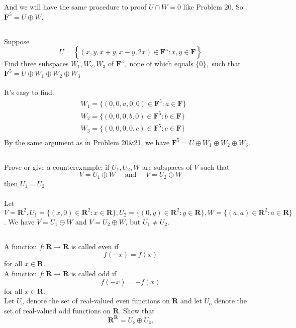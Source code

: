 \documentclass[a4paper]{article}
\begin{document}
And we will have the same procedure to proof $U \cap W = {0}$ like Problem 20. So $\mathbf{F}^{5}=U \oplus W$.

\subsection{}
Suppose
\[
    U=\left\{(x, y, x+y, x-y, 2 x) \in \mathbf{F}^{5}: x, y \in \mathbf{F}\right\}
\]
Find three subspaces $W_{1}, W_{2}, W_{3}$ of $\mathbf{F}^{5},$ none of which equals $\{0\},$ such that $\mathbf{F}^{5}=U \oplus W_{1} \oplus W_{2} \oplus W_{3}$
\paragraph{}
It's easy to find.
\[
    \begin{aligned}
         & W_1 = \{(0,0,a,0,0) \in \mathbf{F}^5: a \in \mathbf{F}\} \\
         & W_2 = \{(0,0,0,b,0) \in \mathbf{F}^5: b \in \mathbf{F}\} \\
         & W_3 = \{(0,0,0,0,c) \in \mathbf{F}^5: c \in \mathbf{F}\} \\
    \end{aligned}
\]
By the same argument as in Problem 20\&21, we have $\mathbf{F}^5 = U \oplus W_1 \oplus W_2 \oplus W_3$.

\subsection{}
Prove or give a counterexample: if $U_{1}, U_{2}, W$ are subspaces of $V$ such that
\[
    V=U_{1} \oplus W \quad \text { and } \quad V=U_{2} \oplus W
\]
then $U_{1}=U_{2}$
\paragraph{}
Let $V = \mathbf{R}^2, U_1 = \{(x,0)\in \mathbf{R}^2 : x\in \mathbf{R}\}, U_2 = \{(0,y)\in \mathbf{R}^2 : y\in \mathbf{R}\}, W = \{(a,a)\in \mathbf{R}^2: a\in \mathbf{R}\}$.
We have $V = U_1 \oplus W$ and $V = U_2 \oplus W$, but $U_1\neq U_2$.

\subsection{}
A function $f: \mathbf{R} \rightarrow \mathbf{R}$ is called even if
\[
    f(-x)=f(x)
\]
for all $x \in \mathbf{R} .$ \\
A function $f: \mathbf{R} \rightarrow \mathbf{R}$ is called odd if
\[
    f(-x)=-f(x)
\]
for all $x \in \mathbf{R} .$ \\
Let $U_{\mathrm{e}}$ denote the set of real-valued even functions on $\mathbf{R}$ and let $U_{\mathrm{o}}$ denote the set of real-valued odd functions on $\mathbf{R}$. Show that
\[
    \mathbf{R}^{\mathbf{R}}=U_{\mathrm{e}} \oplus U_{\mathrm{o}}.
\]
\end{document}
